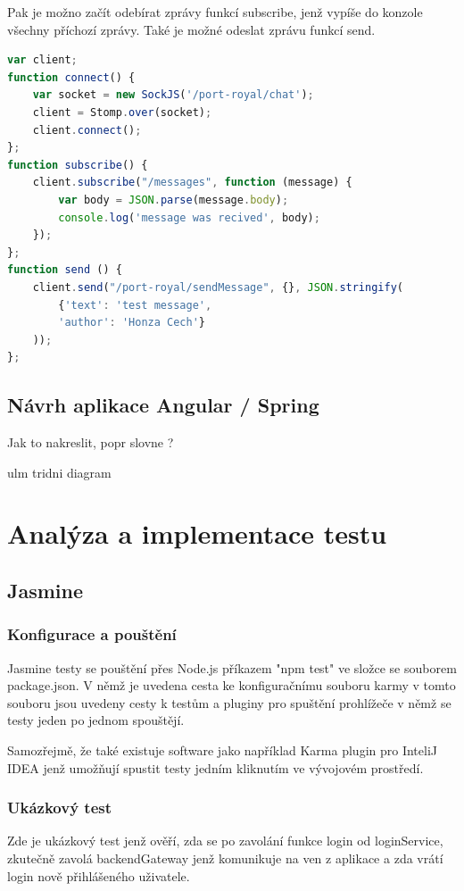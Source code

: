 \documentclass[czech,master,public,dept460,male,cpdeclaration,twoside]{diploma}
\begin{document}
Pak je možno začít odebírat zprávy funkcí subscribe, jenž vypíše do konzole všechny příchozí zprávy. Také je možné odeslat zprávu funkcí send.

\begin{lstlisting}[language=JavaScript, caption=Použití websocketu na straně klienta]
var client;      
function connect() {
    var socket = new SockJS('/port-royal/chat');
    client = Stomp.over(socket);
    client.connect();
};
function subscribe() {
    client.subscribe("/messages", function (message) {
        var body = JSON.parse(message.body);
        console.log('message was recived', body);
    });
};
function send () {
    client.send("/port-royal/sendMessage", {}, JSON.stringify(
        {'text': 'test message',
        'author': 'Honza Cech'}
    ));
};
\end{lstlisting}

\subsection{Návrh aplikace Angular / Spring}
Jak to nakreslit, popr slovne ?

ulm tridni diagram

\section{Analýza a implementace testu}

\subsection{Jasmine}
\subsubsection{Konfigurace a pouštění}
Jasmine testy se pouštění přes Node.js příkazem "npm test" ve složce se souborem package.json. V němž je uvedena cesta ke konfiguračnímu souboru karmy v tomto souboru jsou uvedeny cesty k testům a pluginy pro spuštění prohlížeče v němž se testy jeden po jednom spouštějí. 

Samozřejmě, že také existuje software jako například Karma plugin pro InteliJ IDEA jenž umožňují spustit testy jedním kliknutím ve vývojovém prostředí.

\subsubsection{Ukázkový test}
Zde je ukázkový test jenž ověří, zda se po zavolání funkce login od loginService, zkutečně zavolá backendGateway jenž komunikuje na ven z aplikace a zda vrátí login nově přihlášeného uživatele.
  
\end{document}
